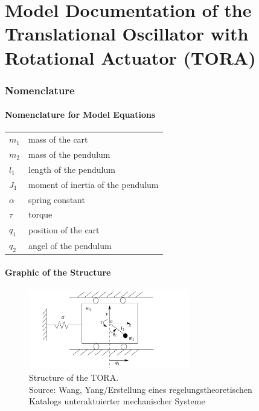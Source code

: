 \documentclass[10pt,a4paper]{article}
\begin{document}
	\part*{Model Documentation of the \\ Translational Oscillator with Rotational Actuator  (TORA)} %
	
	
	\section{Nomenclature} %
	\subsection{Nomenclature for Model Equations} %
	
	\begin{tabular}{ll}
		$m_1$ & mass of the cart \\
		$m_2$ & mass of the pendulum \\
		$l_1$ & length of the pendulum \\
		$J_1$ & moment of inertia of the pendulum \\	
		$\alpha$ & spring constant \\
		$\tau$ & torque \\
		$q_1$ & position of the cart \\
		$q_2$ & angel of the pendulum \\
				
	\end{tabular}
	 
	\subsection{Graphic of the Structure}	
	\begin{figure}[H]
		\centering
		\captionsetup{justification=centering, margin=1cm}
		\includegraphics[width=70mm]{tora.pdf}
		\caption{Structure of the TORA. \\ \footnotesize{Source: Wang, Yang/Erstellung eines regelungstheoretischen Katalogs unteraktuierter mechanischer Systeme}}
	\end{figure}
	
\end{document}

